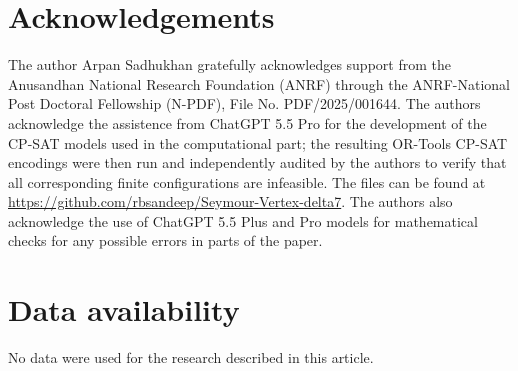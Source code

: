 \documentclass[a4paper,fleqn]{cas-sc}
\theoremstyle{definition}
\begin{document}
\section*{Acknowledgements}
The author Arpan Sadhukhan gratefully acknowledges support from the Anusandhan National Research Foundation (ANRF) through the ANRF-National Post Doctoral Fellowship (N-PDF), File No. PDF/2025/001644.  The authors acknowledge the assistence from ChatGPT 5.5 Pro for the development of the CP-SAT models used in the computational part; the resulting OR-Tools CP-SAT encodings were then run and independently audited by the authors to verify that all corresponding finite configurations are infeasible. The files can be found at \url{https://github.com/rbsandeep/Seymour-Vertex-delta7}. The authors also acknowledge the use of ChatGPT 5.5 Plus and Pro models for mathematical checks for any possible errors in parts of the paper.



\section*{Data availability}

No data were used for the research described in this article.



\end{document}
